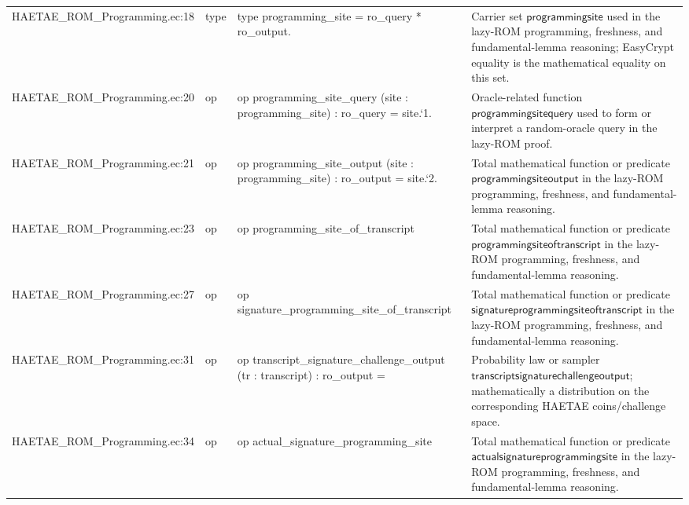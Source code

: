 \documentclass[10pt]{article}
\begin{document}
\begin{longtable}{L{0.11\textwidth}L{0.055\textwidth}L{0.385\textwidth}L{0.41\textwidth}}
HAETAE\_\allowbreak{}ROM\_\allowbreak{}Programming.\allowbreak{}ec:\allowbreak{}18 & type & {\ttfamily\scriptsize type programming\_\allowbreak{}site = ro\_\allowbreak{}query * ro\_\allowbreak{}output.} & Carrier set $\mathsf{programmingsite}$ used in the lazy-ROM programming, freshness, and fundamental-lemma reasoning; EasyCrypt equality is the mathematical equality on this set. \\
HAETAE\_\allowbreak{}ROM\_\allowbreak{}Programming.\allowbreak{}ec:\allowbreak{}20 & op & {\ttfamily\scriptsize op programming\_\allowbreak{}site\_\allowbreak{}query (site : programming\_\allowbreak{}site) : ro\_\allowbreak{}query = site.`1.} & Oracle-related function $\mathsf{programmingsitequery}$ used to form or interpret a random-oracle query in the lazy-ROM proof. \\
HAETAE\_\allowbreak{}ROM\_\allowbreak{}Programming.\allowbreak{}ec:\allowbreak{}21 & op & {\ttfamily\scriptsize op programming\_\allowbreak{}site\_\allowbreak{}output (site : programming\_\allowbreak{}site) : ro\_\allowbreak{}output = site.`2.} & Total mathematical function or predicate $\mathsf{programmingsiteoutput}$ in the lazy-ROM programming, freshness, and fundamental-lemma reasoning. \\
HAETAE\_\allowbreak{}ROM\_\allowbreak{}Programming.\allowbreak{}ec:\allowbreak{}23 & op & {\ttfamily\scriptsize op programming\_\allowbreak{}site\_\allowbreak{}of\_\allowbreak{}transcript} & Total mathematical function or predicate $\mathsf{programmingsiteoftranscript}$ in the lazy-ROM programming, freshness, and fundamental-lemma reasoning. \\
HAETAE\_\allowbreak{}ROM\_\allowbreak{}Programming.\allowbreak{}ec:\allowbreak{}27 & op & {\ttfamily\scriptsize op signature\_\allowbreak{}programming\_\allowbreak{}site\_\allowbreak{}of\_\allowbreak{}transcript} & Total mathematical function or predicate $\mathsf{signatureprogrammingsiteoftranscript}$ in the lazy-ROM programming, freshness, and fundamental-lemma reasoning. \\
HAETAE\_\allowbreak{}ROM\_\allowbreak{}Programming.\allowbreak{}ec:\allowbreak{}31 & op & {\ttfamily\scriptsize op transcript\_\allowbreak{}signature\_\allowbreak{}challenge\_\allowbreak{}output (tr : transcript) : ro\_\allowbreak{}output =} & Probability law or sampler $\mathsf{transcriptsignaturechallengeoutput}$; mathematically a distribution on the corresponding HAETAE coins/challenge space. \\
HAETAE\_\allowbreak{}ROM\_\allowbreak{}Programming.\allowbreak{}ec:\allowbreak{}34 & op & {\ttfamily\scriptsize op actual\_\allowbreak{}signature\_\allowbreak{}programming\_\allowbreak{}site} & Total mathematical function or predicate $\mathsf{actualsignatureprogrammingsite}$ in the lazy-ROM programming, freshness, and fundamental-lemma reasoning. \\

\end{longtable}
\end{document}
